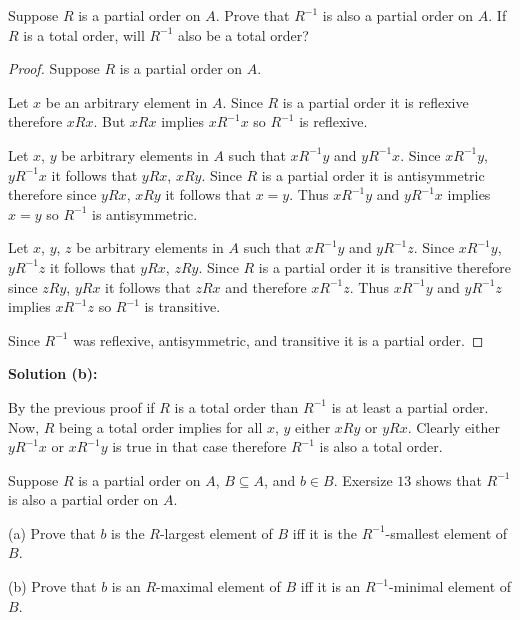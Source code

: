 \begin{tcolorbox}[title=Problem 13, breakable]
    Suppose $R$ is a partial order on $A$. Prove that $R^{-1}$
    is also a partial order on $A$. If $R$ is a total order,
    will $R^{-1}$ also be a total order?
\end{tcolorbox}

\begin{proof}
    Suppose $R$ is a partial order on $A$.

    Let $x$ be an arbitrary element in $A$.
    Since $R$ is a partial order it is reflexive therefore $xRx$.
    But $xRx$ implies $xR^{-1}x$ so $R^{-1}$ is reflexive.

    Let $x$, $y$ be arbitrary elements in $A$ such that $xR^{-1}y$ and $yR^{-1}x$.
    Since $xR^{-1}y$, $yR^{-1}x$ it follows that $yRx$, $xRy$.
    Since $R$ is a partial order it is antisymmetric therefore since $yRx$, $xRy$
        it follows that $x = y$.
    Thus $xR^{-1}y$ and $yR^{-1}x$ implies $x = y$ so $R^{-1}$ is antisymmetric.

    Let $x$, $y$, $z$ be arbitrary elements in $A$ such that $xR^{-1}y$ and $yR^{-1}z$.
    Since $xR^{-1}y$, $yR^{-1}z$ it follows that $yRx$, $zRy$.
    Since $R$ is a partial order it is transitive therefore since $zRy$, $yRx$
        it follows that $zRx$ and therefore $xR^{-1}z$.
    Thus $xR^{-1}y$ and $yR^{-1}z$ implies $xR^{-1}z$ so $R^{-1}$ is transitive.

    Since $R^{-1}$ was reflexive, antisymmetric, and transitive it is a partial order.
\end{proof}

\textbf{Solution (b):}

By the previous proof if $R$ is a total order than $R^{-1}$ is at least a partial order.
Now, $R$ being a total order implies for all $x$, $y$ either $xRy$ or $yRx$.
Clearly either $yR^{-1}x$ or $xR^{-1}y$ is true in that case therefore $R^{-1}$ is 
also a total order.

\begin{tcolorbox}[title=Problem 14, breakable]
    Suppose $R$ is a partial order on $A$, $B \subseteq A$, and $b \in B$.
    Exersize $13$ shows that $R^{-1}$ is also a partial order on $A$.

    (a) Prove that $b$ is the $R$-largest element of $B$ iff it is the $R^{-1}$-smallest
        element of $B$.

    (b) Prove that $b$ is an $R$-maximal element of $B$ iff it is an $R^{-1}$-minimal 
        element of $B$.
\end{tcolorbox}

